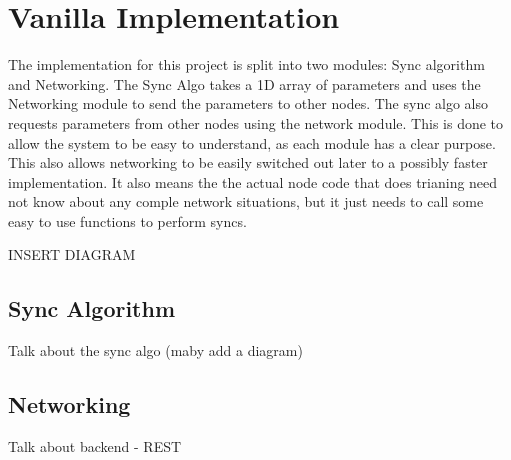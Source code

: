 \chapter{Vanilla Implementation}
The implementation for this project is split into two modules: Sync algorithm and Networking. The Sync Algo takes a 1D array of parameters and uses the Networking module to send the parameters to other nodes. The sync algo also requests parameters from other nodes using the network module. This is done to allow the system to be easy to understand, as each module has a clear purpose. This also allows networking to be easily switched out later to a possibly faster implementation. It also means the the actual node code that does trianing need not know about any comple network situations, but it just needs to call some easy to use functions to perform syncs.

INSERT DIAGRAM

\section{Sync Algorithm}
Talk about the sync algo (maby add a diagram)


\section{Networking}
Talk about backend - REST